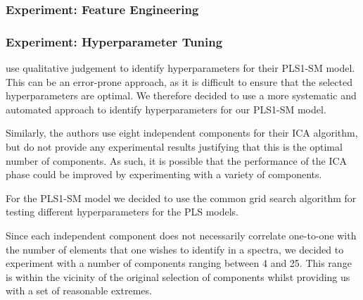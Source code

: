 \subsubsection{Experiment: Feature Engineering}\label{sec:experiment_feature_engineering}


\subsubsection{Experiment: Hyperparameter Tuning}\label{sec:experiment_hyperparameter_tuning}
\citet{cleggRecalibrationMarsScience2017} use qualitative judgement to identify hyperparameters for their PLS1-SM model.
This can be an error-prone approach, as it is difficult to ensure that the selected hyperparameters are optimal.
We therefore decided to use a more systematic and automated approach to identify hyperparameters for our PLS1-SM model.

Similarly, the authors use eight independent components for their ICA algorithm, but do not provide any experimental results justifying that this is the optimal number of components.
As such, it is possible that the performance of the ICA phase could be improved by experimenting with a variety of components.

For the PLS1-SM model we decided to use the common grid search algorithm for testing different hyperparameters for the PLS models.

Since each independent component does not necessarily correlate one-to-one with the number of elements that one wishes to identify in a spectra, we decided to experiment with a number of components ranging between 4 and 25.
This range is within the vicinity of the original selection of components whilst providing us with a set of reasonable extremes.

